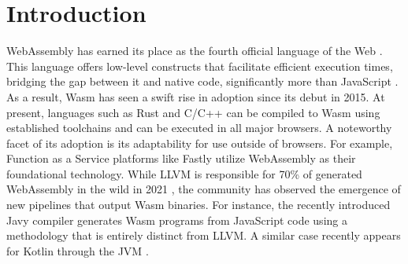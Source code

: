 \documentclass[sigplan,screen]{acmart}
\newcommand{\wasm}{Wasm\xspace}
\newcommand{\Wasm}{WebAssembly\xspace}
\begin{document}
\maketitle


\section{Introduction}

\Wasm has earned its place as the fourth official language of the Web \cite{WebAssemblyCoreSpecification}.
This language offers low-level constructs that facilitate efficient execution times, bridging the gap between it and native code, significantly more than JavaScript \cite{haas2017bringing}.
As a result, \wasm has seen a swift rise in adoption since its debut in 2015.
At present, languages such as Rust and C/C++ can be compiled to \wasm using established toolchains and can be executed in all major browsers.
A noteworthy facet of its adoption is its adaptability for use outside of browsers.
For example, Function as a Service platforms like Fastly \cite{fastly} utilize WebAssembly as their foundational technology.
While LLVM is responsible for 70\% of generated \Wasm in the wild in 2021 \cite{hilbig2021empirical}, the community has observed the emergence of new pipelines that output \wasm binaries.
For instance, the recently introduced Javy compiler \cite{javy} generates \wasm programs from JavaScript code using a methodology that is entirely distinct from LLVM.
A similar case recently appears for Kotlin through the JVM \cite{kmm}.
\end{document}
